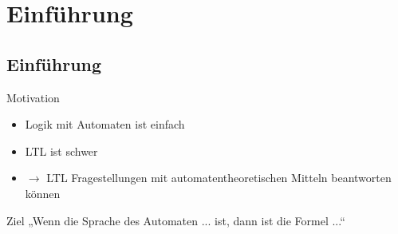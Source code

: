 \section{Einführung}
\subsection{Einführung}
\begin{frame}{\insertsubsection}
    \begin{block}{Motivation}
    \begin{itemize}[<+->]
        \item Logik mit Automaten ist einfach
        \item LTL ist schwer
        \item $\rightarrow$ LTL Fragestellungen mit automatentheoretischen Mitteln beantworten können
    \end{itemize}
    \end{block}
    \pause
    \begin{block}{Ziel}
        „Wenn die Sprache des Automaten ... ist, dann ist die Formel ...“
    \end{block}
\end{frame}